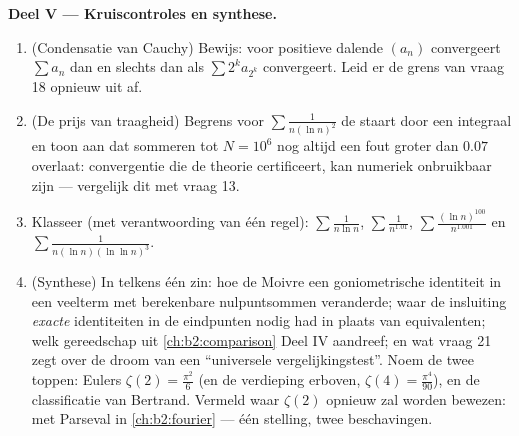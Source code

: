\begin{problem}[{Weekendopgave --- $\zeta(2) = \pi^2/6$ en het
panorama van Bertrand}]
\medskip
\noindent\textbf{Deel V --- Kruiscontroles en synthese.}
\begin{enumerate}[resume]
  \item (Condensatie van Cauchy) Bewijs: voor positieve dalende
        $(a_n)$ convergeert $\sum a_n$ dan en slechts dan als
        $\sum 2^k a_{2^k}$ convergeert. Leid er de grens van vraag
        18 opnieuw uit af.
  \item (De prijs van traagheid) Begrens voor $\sum\frac1{n(\ln
        n)^2}$ de staart door een integraal en toon aan dat
        sommeren tot $N = 10^6$ nog altijd een fout groter dan
        $0.07$ overlaat: convergentie die de theorie certificeert,
        kan numeriek onbruikbaar zijn --- vergelijk dit met vraag
        13.
  \item Klasseer (met verantwoording van één regel):
        $\sum\frac1{n\ln n}$, $\sum\frac1{n^{1.01}}$,
        $\sum\frac{(\ln n)^{100}}{n^{1.001}}$ en
        $\sum\frac1{n(\ln n)(\ln\ln n)^{3}}$.
  \item (Synthese) In telkens één zin: hoe de Moivre een
        goniometrische identiteit in een veelterm met berekenbare
        nulpuntsommen veranderde; waar de insluiting \emph{exacte}
        identiteiten in de eindpunten nodig had in plaats van
        equivalenten; welk gereedschap uit \cref{ch:b2:comparison}
        Deel IV aandreef; en wat vraag 21 zegt over de droom van
        een ``universele vergelijkingstest''. Noem de twee toppen:
        Eulers $\zeta(2) = \frac{\pi^2}6$ (en de verdieping
        erboven, $\zeta(4) = \frac{\pi^4}{90}$), en de
        classificatie van Bertrand. Vermeld waar $\zeta(2)$
        opnieuw zal worden bewezen: met Parseval in
        \cref{ch:b2:fourier} --- één stelling, twee
        beschavingen.
\end{enumerate}
\end{problem}
